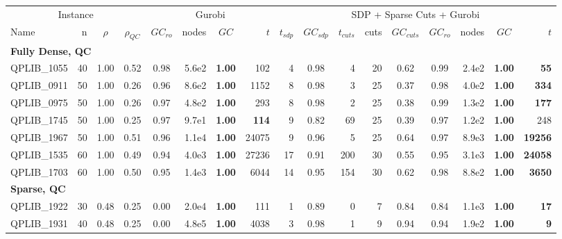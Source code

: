 \documentclass[twoside]{article}
\begin{document}
\begin{table}[h!]
{				%
			\begin{tabular}{lrcc|crcr|rcrrccrcr}
				\toprule
				\multicolumn{4}{c|}{Instance} & \multicolumn{4}{c|}{Gurobi} & \multicolumn{9}{c}{SDP + Sparse Cuts + Gurobi} \\
				Name & n & $\rho$ & $\rho_{QC}$ & $GC_{ro}$ & nodes & $GC$ & $t$ & $t_{sdp}$ & $GC_{sdp}$ & $t_{cuts}$ & cuts & $GC_{cuts}$ & $GC_{ro}$ & nodes & $GC$ & $t$ \\
				\midrule
				\multicolumn{15}{l}{\textbf{Fully Dense, QC}}\\
				\addlinespace[2pt]
				QPLIB\_1055 & 40 & 1.00 & 0.52 & 0.98 & 5.6e2 & \textbf{1.00} & 102 & 4 & 0.98 & 4 & 20 & 0.62 & 0.99 & 2.4e2 & \textbf{1.00} & \textbf{55} \\
				QPLIB\_0911 & 50 & 1.00 & 0.26 & 0.96 & 8.6e2 & \textbf{1.00} & 1152 & 8 & 0.98 & 3 & 25 & 0.37 & 0.98 & 4.0e2 & \textbf{1.00} & \textbf{334} \\
				QPLIB\_0975 & 50 & 1.00 & 0.26 & 0.97 & 4.8e2 & \textbf{1.00} & 293 & 8 & 0.98 & 2 & 25 & 0.38 & 0.99 & 1.3e2 & \textbf{1.00} & \textbf{177} \\
				QPLIB\_1745 & 50 & 1.00 & 0.25 & 0.97 & 9.7e1 & \textbf{1.00} & \textbf{114} & 9 & 0.82 & 69 & 25 & 0.39 & 0.97 & 1.2e2 & \textbf{1.00} & 248 \\
				QPLIB\_1967 & 50 & 1.00 & 0.51 & 0.96 & 1.1e4 & \textbf{1.00} & 24075 & 9 & 0.96 & 5 & 25 & 0.64 & 0.97 & 8.9e3 & \textbf{1.00} & \textbf{19256} \\
				QPLIB\_1535 & 60 & 1.00 & 0.49 & 0.94 & 4.0e3 & \textbf{1.00} & 27236 & 17 & 0.91 & 200 & 30 & 0.55 & 0.95 & 3.1e3 & \textbf{1.00} & \textbf{24058} \\
				QPLIB\_1703 & 60 & 1.00 & 0.50 & 0.95 & 1.4e3 & \textbf{1.00} & 6044 & 14 & 0.95 & 154 & 30 & 0.62 & 0.98 & 8.8e2 & \textbf{1.00} & \textbf{3650} \\
				\midrule
				\multicolumn{15}{l}{\textbf{Sparse, QC}}\\
				\addlinespace[2pt]
				QPLIB\_1922 & 30 & 0.48 & 0.25 & 0.00 & 2.0e4 & \textbf{1.00} & 111 & 1 & 0.89 & 0 & 7 & 0.84 & 0.84 & 1.1e3 & \textbf{1.00} & \textbf{17} \\
				QPLIB\_1931 & 40 & 0.48 & 0.25 & 0.00 & 4.8e5 & \textbf{1.00} & 4038 & 3 & 0.98 & 1 & 9 & 0.94 & 0.94 & 1.9e2 & \textbf{1.00} & \textbf{9} \\

\end{tabular}}
\end{table}
\end{document}

